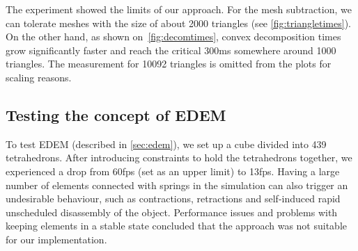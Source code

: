The experiment showed the limits of our approach. For the mesh subtraction, we can tolerate meshes with the size of about 2000 triangles (see \cref{fig:triangletimes}).  On the other hand, as shown on~\cref{fig:decomtimes}, convex decomposition times grow significantly faster and reach the critical 300ms somewhere around 1000 triangles. The measurement for 10092 triangles is omitted from the plots for scaling reasons.


\subsection{Testing the concept of EDEM}
\label{sec:edemtest}
To test EDEM (described in \cref{sec:edem}), we set up a cube divided into 439 tetrahedrons. After introducing constraints to hold the tetrahedrons together, we experienced a drop from 60fps (set as an upper limit) to 13fps. Having a large number of elements connected with springs in the simulation can also trigger an undesirable behaviour, such as contractions, retractions and self-induced rapid unscheduled disassembly of the object. Performance issues and problems with keeping elements in a stable state concluded that the approach was not suitable for our implementation.





